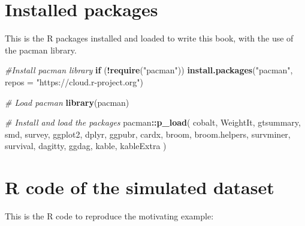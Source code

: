 \documentclass[
]{book}
\newenvironment{Shaded}{\begin{snugshade}}{\end{snugshade}}
\newcommand{\AttributeTok}[1]{\textcolor[rgb]{0.13,0.29,0.53}{#1}}
\newcommand{\CommentTok}[1]{\textcolor[rgb]{0.56,0.35,0.01}{\textit{#1}}}
\newcommand{\ControlFlowTok}[1]{\textcolor[rgb]{0.13,0.29,0.53}{\textbf{#1}}}
\newcommand{\FunctionTok}[1]{\textcolor[rgb]{0.13,0.29,0.53}{\textbf{#1}}}
\newcommand{\NormalTok}[1]{#1}
\newcommand{\SpecialCharTok}[1]{\textcolor[rgb]{0.81,0.36,0.00}{\textbf{#1}}}
\newcommand{\StringTok}[1]{\textcolor[rgb]{0.31,0.60,0.02}{#1}}
\begin{document}
\chapter{Installed packages}\label{r-packages}

This is the R packages installed and loaded to write this book, with the
use of the pacman library.

\begin{Shaded}
\begin{Highlighting}[]
\CommentTok{\#Install pacman library}
\ControlFlowTok{if}\NormalTok{ (}\SpecialCharTok{!}\FunctionTok{require}\NormalTok{(}\StringTok{"pacman"}\NormalTok{)) }\FunctionTok{install.packages}\NormalTok{(}\StringTok{"pacman"}\NormalTok{, }\AttributeTok{repos =} \StringTok{"https://cloud.r{-}project.org"}\NormalTok{)}

\CommentTok{\# Load pacman}
\FunctionTok{library}\NormalTok{(pacman)}

\CommentTok{\# Install and load the packages}
\NormalTok{pacman}\SpecialCharTok{::}\FunctionTok{p\_load}\NormalTok{(}
\NormalTok{  cobalt,}
\NormalTok{  WeightIt,}
\NormalTok{  gtsummary,}
\NormalTok{  smd,}
\NormalTok{  survey,}
\NormalTok{  ggplot2,}
\NormalTok{  dplyr,}
\NormalTok{  ggpubr,}
\NormalTok{  cardx,}
\NormalTok{  broom,}
\NormalTok{  broom.helpers,}
\NormalTok{  survminer,}
\NormalTok{  survival,}
\NormalTok{  dagitty,}
\NormalTok{  ggdag,}
\NormalTok{  kable,}
\NormalTok{  kableExtra}
\NormalTok{)}
\end{Highlighting}
\end{Shaded}

\chapter{R code of the simulated dataset}\label{r-code}

This is the R code to reproduce the motivating example:
\end{document}

